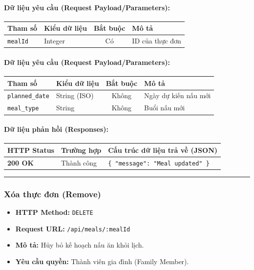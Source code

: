\documentclass[12pt,a4paper]{article}
\begin{document}
\paragraph{Dữ liệu yêu cầu (Request Payload/Parameters):}
\begin{longtable}{|>{\raggedright\arraybackslash}p{2.8cm}|>{\raggedright\arraybackslash}p{2.2cm}|c|>{\raggedright\arraybackslash}p{7.0cm}|}
\hline
\textbf{Tham số} & \textbf{Kiểu dữ liệu} & \textbf{Bắt buộc} & \textbf{Mô tả} \\ \hline
\endhead
\texttt{mealId} & Integer & Có & ID của thực đơn \\ \hline
\end{longtable}

\paragraph{Dữ liệu yêu cầu (Request Payload/Parameters):}
\begin{longtable}{|>{\raggedright\arraybackslash}p{2.8cm}|>{\raggedright\arraybackslash}p{2.2cm}|c|>{\raggedright\arraybackslash}p{7.0cm}|}
\hline
\textbf{Tham số} & \textbf{Kiểu dữ liệu} & \textbf{Bắt buộc} & \textbf{Mô tả} \\ \hline
\endhead
\texttt{planned\_date} & String (ISO) & Không & Ngày dự kiến nấu mới \\ \hline
\texttt{meal\_type} & String & Không & Buổi nấu mới \\ \hline
\end{longtable}

\paragraph{Dữ liệu phản hồi (Responses):}
\begin{longtable}{|>{\raggedright\arraybackslash}p{2.8cm}|>{\raggedright\arraybackslash}p{3.2cm}|>{\raggedright\arraybackslash}p{8.0cm}|}
\hline
\textbf{HTTP Status} & \textbf{Trường hợp} & \textbf{Cấu trúc dữ liệu trả về (JSON)} \\ \hline
\endhead
\textbf{200 OK} & Thành công & \texttt{\{ "message": "Meal updated" \}} \\ \hline
\end{longtable}

\vskip 0.4cm
\noindent\rule{\textwidth}{0.3pt}
\vskip 0.4cm

\subsubsection{Xóa thực đơn (Remove)}
\begin{itemize}[leftmargin=*]
    \item \textbf{HTTP Method:} \texttt{DELETE}
    \item \textbf{Request URL:} \texttt{/api/meals/:mealId}
    \item \textbf{Mô tả:} Hủy bỏ kế hoạch nấu ăn khỏi lịch.
    \item \textbf{Yêu cầu quyền:} Thành viên gia đình (Family Member).
\end{itemize}
\end{document}
